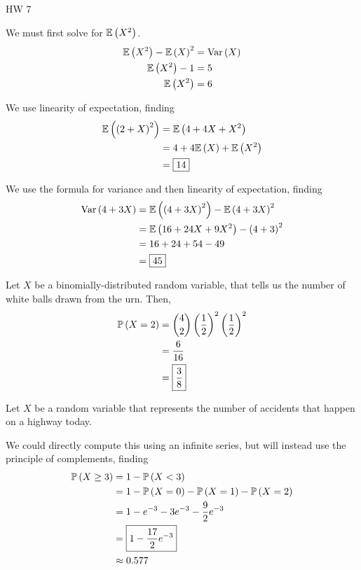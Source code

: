 \documentclass{article}
\begin{document}
\begin{center}
  \Large HW 7
\end{center}


\setcounter{problem}{38}
\problem{}

We must first solve for $\mathbb{E} \left ( X^2 \right)$.
\begin{align*}
  \mathbb{E} \left ( X^2 \right) - \mathbb{E} \left ( X \right)^2 &= \text{Var} \left( X \right) \\
  \mathbb{E} \left ( X^2 \right) - 1 &= 5 \\
  \mathbb{E} \left ( X^2 \right) &= 6 \\
\end{align*}

\subproblema{}
We use linearity of expectation, finding
\begin{align*}
  \mathbb{E} \left ( \left (2+X \right)^2 \right) &= \mathbb{E} \left ( 4 + 4X + X^2 \right) \\
                    &= 4 + 4 \mathbb{E} \left ( X \right) + \mathbb{E} \left ( X^2 \right) \\
                    &= \boxed{14} \\
\end{align*}

\subproblema{}
We use the formula for variance and then linearity of expectation, finding
\begin{align*}
  \text{Var} \left( 4+3X \right) &= \mathbb{E} \left ( \left (4+3X \right)^2 \right) - \mathbb{E} \left ( 4+3X \right)^2 \\
             &= \mathbb{E} \left ( 16 + 24 X + 9 X^2 \right) - \left (4 + 3 \right)^2 \\
             &= 16 + 24 + 54 - 49 \\
             &= \boxed{45} \\
\end{align*}

\problem{}
Let $X$ be a binomially-distributed random variable,
that tells us the number of white balls drawn from the urn.
Then,
\begin{align*}
  \mathbb{P} \left ( X = 2 \right) &= \binom{4}{2} \left (\frac{1}{2} \right)^2 \left (\frac{1}{2} \right)^2 \\
             &= \frac{6}{16} \\
             &= \boxed{\frac{3}{8}} \\
\end{align*}


\setcounter{problem}{59}
\problem{}
Let $X$ be a random variable that represents the number of accidents that happen on a highway today.

\subproblema{}
We could directly compute this using an infinite series,
but will instead use the principle of complements,
finding
\begin{align*}
  \mathbb{P} \left ( X \geq 3 \right) &= 1 - \mathbb{P} \left ( X < 3 \right) \\
                &= 1 - \mathbb{P} \left ( X = 0 \right) - \mathbb{P} \left ( X = 1 \right) - \mathbb{P} \left ( X = 2 \right) \\
                &= 1 - e^{-3} - 3 e^{-3} - \frac{9}{2} e^{-3} \\
                &= \boxed{1 - \frac{17}{2} e^{-3}} \\
                &\approx 0.577 \\
\end{align*}
\end{document}
